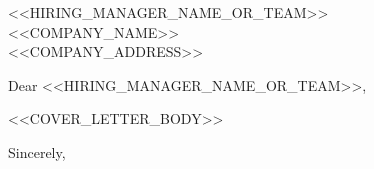 \documentclass[11pt,a4paper]{letter}
\begin{document}
\begin{letter}{
    <<HIRING_MANAGER_NAME_OR_TEAM>>\\
    <<COMPANY_NAME>>\\
    <<COMPANY_ADDRESS>>
}

\opening{Dear <<HIRING_MANAGER_NAME_OR_TEAM>>,}

<<COVER_LETTER_BODY>>

\closing{Sincerely,}

\end{letter}
\end{document}
